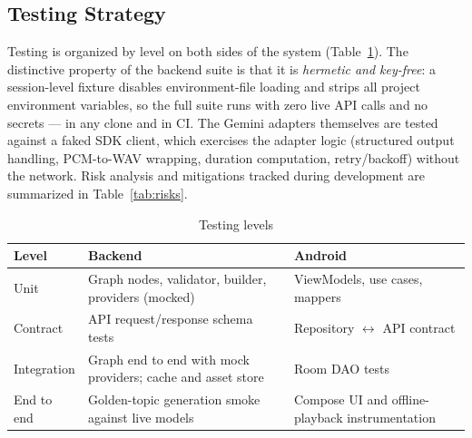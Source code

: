 \subsection{Testing Strategy}

Testing is organized by level on both sides of the system
(Table~\ref{tab:testing}). The distinctive property of the backend suite is
that it is \emph{hermetic and key-free}: a session-level fixture disables
environment-file loading and strips all project environment variables, so the
full suite runs with zero live API calls and no secrets --- in any clone and
in CI. The Gemini adapters themselves are tested against a faked SDK client,
which exercises the adapter logic (structured output handling, PCM-to-WAV
wrapping, duration computation, retry/backoff) without the network. Risk
analysis and mitigations tracked during development are summarized in
Table~\ref{tab:risks}.

\begin{table}[htbp]
\caption{Testing levels}
\label{tab:testing}
\centering
\small
\renewcommand{\arraystretch}{1.3}
\begin{tabular}{@{}lp{}p{}@{}}
\toprule
\textbf{Level} & \textbf{Backend} & \textbf{Android}\\
\midrule
Unit & Graph nodes, validator, builder, providers (mocked) & ViewModels,
use cases, mappers\\
Contract & API request/response schema tests & Repository $\leftrightarrow$
API contract\\
Integration & Graph end to end with mock providers; cache and asset store &
Room DAO tests\\
End to end & Golden-topic generation smoke against live models & Compose UI
and offline-playback instrumentation\\
\bottomrule
\end{tabular}
\end{table}

